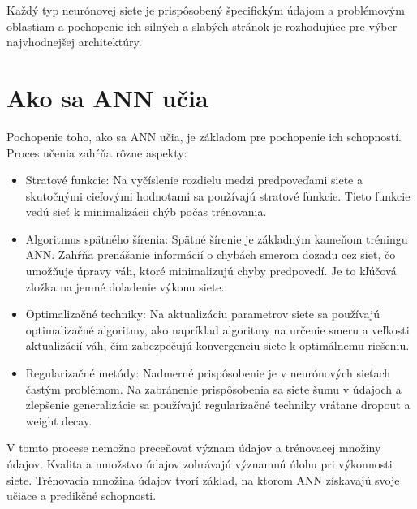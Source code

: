 \documentclass[10pt,twoside,slovak,a4paper]{article}
\begin{document}
 
 
Každý typ neurónovej siete je prispôsobený špecifickým údajom a problémovým oblastiam a pochopenie ich silných a slabých stránok je rozhodujúce pre výber najvhodnejšej architektúry.
 
\section{Ako sa ANN učia} \label{nejaka} \cite{geeksforgeeks2023artificial}

Pochopenie toho, ako sa ANN učia, je základom pre pochopenie ich schopností. Proces učenia zahŕňa rôzne aspekty:
 \begin{itemize}
\item Stratové funkcie: Na vyčíslenie rozdielu medzi predpoveďami siete a skutočnými cieľovými hodnotami sa používajú stratové funkcie. Tieto funkcie vedú sieť k minimalizácii chýb počas trénovania.

 \end{itemize}
 
\begin{itemize}
\item Algoritmus spätného šírenia: Spätné šírenie je základným kameňom tréningu ANN. Zahŕňa prenášanie informácií o chybách smerom dozadu cez sieť, čo umožňuje úpravy váh, ktoré minimalizujú chyby predpovedí. Je to kľúčová zložka na jemné doladenie výkonu siete. 

\end{itemize}

\begin{itemize}
\item Optimalizačné techniky: Na aktualizáciu parametrov siete sa používajú optimalizačné algoritmy, ako napríklad algoritmy na určenie smeru a veľkosti aktualizácií váh, čím zabezpečujú konvergenciu siete k optimálnemu riešeniu. 
\end{itemize}

\begin{itemize}
\item Regularizačné metódy: Nadmerné prispôsobenie je v neurónových sieťach častým problémom. Na zabránenie prispôsobenia sa siete šumu v údajoch a zlepšenie generalizácie sa používajú regularizačné techniky vrátane dropout a weight decay.
 \end{itemize}
 
V tomto procese nemožno preceňovať význam údajov a trénovacej množiny údajov. Kvalita a množstvo údajov zohrávajú významnú úlohu pri výkonnosti siete. Trénovacia množina údajov tvorí základ, na ktorom ANN získavajú svoje učiace a predikčné schopnosti.
\end{document}
